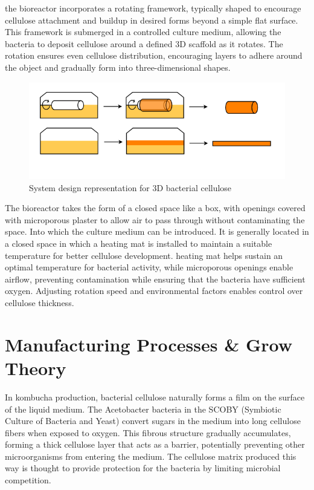 the bioreactor incorporates a rotating framework, typically shaped to encourage cellulose attachment and buildup in desired forms beyond a simple flat surface. This framework is submerged in a controlled culture medium, allowing the bacteria to deposit cellulose around a defined 3D scaffold as it rotates. The rotation ensures even cellulose distribution, encouraging layers to adhere around the object and gradually form into three-dimensional shapes.
\begin{figure}[h]
    \centering
    \includegraphics{images/shema3Dscoby.png}
    \caption{System design representation for 3D bacterial cellulose}
    \label{fig:diagBC3D}
\end{figure} 

The bioreactor takes the form of a closed space like a box, with openings covered with microporous plaster to allow air to pass through without contaminating the space. Into which the culture medium can be introduced.
It is generally located in a closed space in which a heating mat is installed to maintain a suitable temperature for better cellulose development. 
heating mat helps sustain an optimal temperature for bacterial activity, while microporous openings enable airflow, preventing contamination while ensuring that the bacteria have sufficient oxygen. Adjusting rotation speed and environmental factors enables control over cellulose thickness.


\section{Manufacturing Processes \& Grow Theory}

In kombucha production, bacterial cellulose naturally forms a film on the surface of the liquid medium. The Acetobacter bacteria in the SCOBY (Symbiotic Culture of Bacteria and Yeast) convert sugars in the medium into long cellulose fibers when exposed to oxygen. This fibrous structure gradually accumulates, forming a thick cellulose layer that acts as a barrier, potentially preventing other microorganisms from entering the medium. The cellulose matrix produced this way is thought to provide protection for the bacteria by limiting microbial competition.

